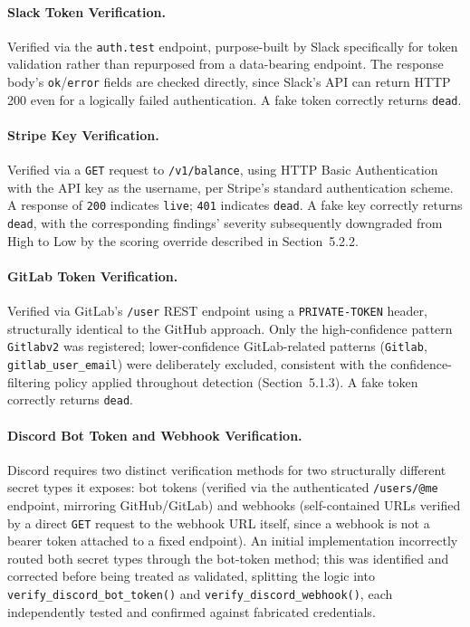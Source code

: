 \documentclass[12pt]{article}
\begin{document}
\paragraph{Slack Token Verification.}
Verified via the \texttt{auth.test} endpoint, purpose-built by Slack specifically for token validation rather than repurposed from a data-bearing endpoint. The response body's \texttt{ok}/\texttt{error} fields are checked directly, since Slack's API can return HTTP 200 even for a logically failed authentication. A fake token correctly returns \texttt{dead}.

\paragraph{Stripe Key Verification.}
Verified via a \texttt{GET} request to \texttt{/v1/balance}, using HTTP Basic Authentication with the API key as the username, per Stripe's standard authentication scheme. A response of \texttt{200} indicates \texttt{live}; \texttt{401} indicates \texttt{dead}. A fake key correctly returns \texttt{dead}, with the corresponding findings' severity subsequently downgraded from High to Low by the scoring override described in Section~5.2.2.

\paragraph{GitLab Token Verification.}
Verified via GitLab's \texttt{/user} REST endpoint using a \texttt{PRIVATE-TOKEN} header, structurally identical to the GitHub approach. Only the high-confidence pattern \texttt{Gitlabv2} was registered; lower-confidence GitLab-related patterns (\texttt{Gitlab}, \texttt{gitlab\_user\_email}) were deliberately excluded, consistent with the confidence-filtering policy applied throughout detection (Section~5.1.3). A fake token correctly returns \texttt{dead}.

\paragraph{Discord Bot Token and Webhook Verification.}
Discord requires two distinct verification methods for two structurally different secret types it exposes: bot tokens (verified via the authenticated \texttt{/users/@me} endpoint, mirroring GitHub/GitLab) and webhooks (self-contained URLs verified by a direct \texttt{GET} request to the webhook URL itself, since a webhook is not a bearer token attached to a fixed endpoint). An initial implementation incorrectly routed both secret types through the bot-token method; this was identified and corrected before being treated as validated, splitting the logic into \texttt{verify\_discord\_bot\_token()} and \texttt{verify\_discord\_webhook()}, each independently tested and confirmed against fabricated credentials.
\end{document}
